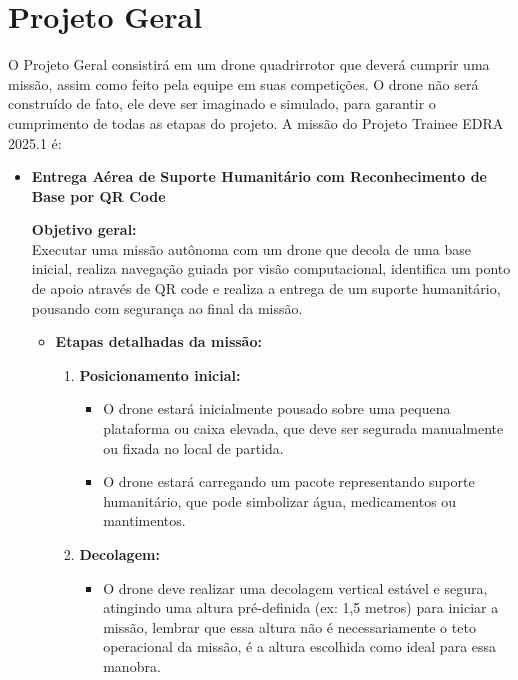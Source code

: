 \section{Projeto Geral}

O Projeto Geral consistirá em um drone quadrirrotor que deverá cumprir uma missão, assim como feito pela equipe em suas competições. O drone não será construído de fato, ele deve ser imaginado e simulado, para garantir o cumprimento de todas as etapas do projeto. A missão do Projeto Trainee EDRA 2025.1 é:

\begin{itemize}
    \item \textbf{Entrega Aérea de Suporte Humanitário com Reconhecimento de Base por QR Code}
    
    \textbf{Objetivo geral:} \\
    Executar uma missão autônoma com um drone que decola de uma base inicial, realiza navegação guiada por visão computacional, identifica um ponto de apoio através de QR code e realiza a entrega de um suporte humanitário, pousando com segurança ao final da missão.
    
    \begin{itemize}
        \item \textbf{Etapas detalhadas da missão:}
        
        \begin{enumerate}
            \item \textbf{Posicionamento inicial:}
            \begin{itemize}
                \item O drone estará inicialmente pousado sobre uma pequena plataforma ou caixa elevada, que deve ser segurada manualmente ou fixada no local de partida.
                \item O drone estará carregando um pacote representando suporte humanitário, que pode simbolizar água, medicamentos ou mantimentos.
            \end{itemize}
            
            \item \textbf{Decolagem:}
            \begin{itemize}
                \item O drone deve realizar uma decolagem vertical estável e segura, atingindo uma altura pré-definida (ex: 1,5 metros) para iniciar a missão, {\color{red}lembrar que essa altura não é necessariamente o teto operacional da missão, é a altura escolhida como ideal para essa manobra}.
            \end{itemize}
            

\end{enumerate}
\end{itemize}
\end{itemize}
